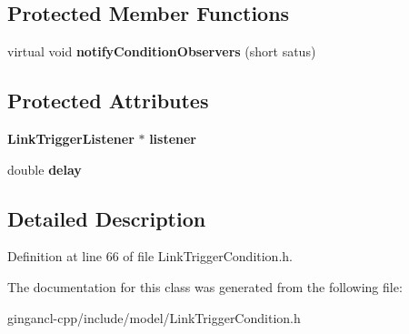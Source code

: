 \subsection*{Protected Member Functions}
\begin{CompactItemize}
\item 
virtual void \textbf{notifyConditionObservers} (short satus)\label{classbr_1_1pucrio_1_1telemidia_1_1ginga_1_1ncl_1_1model_1_1link_1_1LinkTriggerCondition_815c33606d7da1842f2a5c03631707d1}

\end{CompactItemize}
\subsection*{Protected Attributes}
\begin{CompactItemize}
\item 
{\bf LinkTriggerListener} $\ast$ {\bf listener}\label{classbr_1_1pucrio_1_1telemidia_1_1ginga_1_1ncl_1_1model_1_1link_1_1LinkTriggerCondition_2a634aa5932916ede02b4a7fa021924f}

\item 
double {\bf delay}\label{classbr_1_1pucrio_1_1telemidia_1_1ginga_1_1ncl_1_1model_1_1link_1_1LinkTriggerCondition_0bf98c9ae4eac6da250cb1e2fac20365}

\end{CompactItemize}


\subsection{Detailed Description}




Definition at line 66 of file LinkTriggerCondition.h.

The documentation for this class was generated from the following file:\begin{CompactItemize}
\item 
gingancl-cpp/include/model/LinkTriggerCondition.h\end{CompactItemize}
